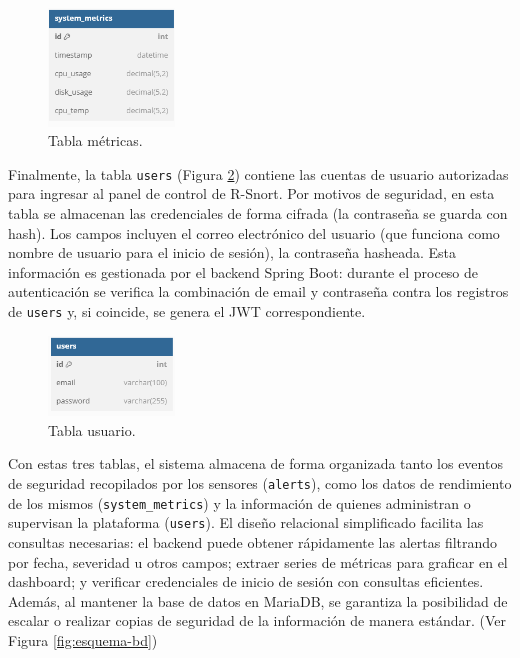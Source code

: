 \documentclass[11pt,a4paper,twoside]{report}
\begin{document}
\begin{figure}[H]
	\centering
	\includegraphics[width=0.3\textwidth]{documento/8.png}
	\caption{Tabla métricas.}
	\label{fig:metricas-bd}
\end{figure}

Finalmente, la tabla \texttt{users} (Figura \ref{fig:usuario-bd}) contiene las cuentas de usuario autorizadas para ingresar al panel de control de R-Snort. Por motivos de seguridad, en esta tabla se almacenan las credenciales de forma cifrada (la contraseña se guarda con hash). Los campos incluyen el correo electrónico del usuario (que funciona como nombre de usuario para el inicio de sesión), la contraseña hasheada. Esta información es gestionada por el backend Spring Boot: durante el proceso de autenticación se verifica la combinación de email y contraseña contra los registros de \texttt{users} y, si coincide, se genera el JWT correspondiente.\newline

\begin{figure}[H]
	\centering
	\includegraphics[width=0.3\textwidth]{documento/9.png}
	\caption{Tabla usuario.}
	\label{fig:usuario-bd}
\end{figure}

Con estas tres tablas, el sistema almacena de forma organizada tanto los eventos de seguridad recopilados por los sensores (\texttt{alerts}), como los datos de rendimiento de los mismos (\texttt{system\_metrics}) y la información de quienes administran o supervisan la plataforma (\texttt{users}). El diseño relacional simplificado facilita las consultas necesarias: el backend puede obtener rápidamente las alertas filtrando por fecha, severidad u otros campos; extraer series de métricas para graficar en el dashboard; y verificar credenciales de inicio de sesión con consultas eficientes. Además, al mantener la base de datos en MariaDB, se garantiza la posibilidad de escalar o realizar copias de seguridad de la información de manera estándar. (Ver Figura \ref{fig:esquema-bd})
\end{document}
